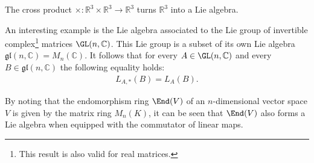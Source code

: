     \begin{example}
        The cross product $\times:\mathbb{R}^3\times\mathbb{R}^3\rightarrow\mathbb{R}^3$ turns $\mathbb{R}^3$ into a Lie algebra.
    \end{example}
    \begin{example}
        An interesting example is the Lie algebra associated to the Lie group of invertible complex\footnote{This result is also valid for real matrices.} matrices $\GL(n,\mathbb{C})$. This Lie group is a subset of its own Lie algebra $\mathfrak{gl}(n,\mathbb{C}) = M_n(\mathbb{C})$. It follows that for every $A\in\GL(n,\mathbb{C})$ and every $B\in\mathfrak{gl}(n,\mathbb{C})$ the following equality holds:
        \begin{gather}
            L_{A,*}(B)=L_A(B).
        \end{gather}
    \end{example}
    \begin{result}\label{lie:end_as_lie_algebra}
        By noting that the endomorphism ring $\End(V)$ of an $n$-dimensional vector space $V$ is given by the matrix ring $M_n(K)$, it can be seen that $\End(V)$ also forms a Lie algebra when equipped with the commutator of linear maps.
    \end{result}

